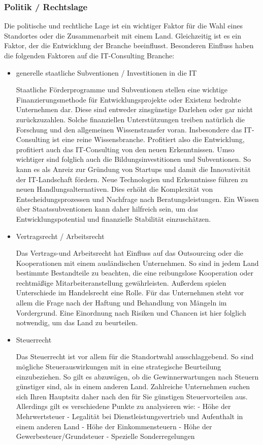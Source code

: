  \subsubsection{Politik / Rechtslage}
Die politische und rechtliche Lage ist ein wichtiger Faktor für die Wahl eines Standortes oder die Zusammenarbeit mit einem Land. Gleichzeitig ist es ein Faktor, der die Entwicklung der Branche beeinflusst.
Besonderen Einfluss haben die folgenden Faktoren auf die IT-Consulting Branche:
\begin{itemize} 
\item {generelle staatliche Subventionen / Investitionen in die IT}

 Staatliche Förderprogramme und Subventionen stellen eine wichtige Finanzierungsmethode für Entwicklungsprojekte oder Existenz bedrohte Unternehmen dar. Diese sind entweder zinsgünstige Darlehen oder gar nicht zurückzuzahlen.
 Solche finanziellen Unterstützungen treiben natürlich die Forschung und den allgemeinen Wissenstransfer voran. Insbesondere das IT-Consulting ist eine reine Wissensbranche. Profitiert also die Entwicklung, profitiert auch das IT-Consulting von den neuen Erkenntnissen. 
 Umso wichtiger sind folglich auch die Bildungsinvestitionen und Subventionen. So kann es als Anreiz zur Gründung von Startups und damit die Innovativität der IT-Landschaft fördern. Neue Technologien und Erkenntnisse führen zu neuen Handlungsalternativen. Dies erhöht die Komplexität von Entscheidungsprozessen und Nachfrage nach Beratungsleistungen.
Ein Wissen über Staatssubventionen kann daher hilfreich sein, um das Entwicklungspotential und finanzielle Stabilität einzuschätzen.

\item  {Vertragsrecht / Arbeitsrecht}

 Das Vertrags-und Arbeitsrecht hat Einfluss auf das Outsourcing oder die Kooperationen mit einem ausländischen Unternehmen. 
 So sind in jedem Land bestimmte Bestandteile zu beachten, die eine reibungslose Kooperation oder rechtmäßige Mitarbeiteranstellung gewährleisten. Außerdem spielen Unterschiede im Handelsrecht eine Rolle. 
Für das Unternehmen steht vor allem die Frage nach der Haftung und Behandlung von Mängeln im Vordergrund. 
Eine Einordnung nach Risiken und Chancen ist hier folglich notwendig, um das Land zu beurteilen. 

\item {Steuerrecht}

 Das Steuerrecht ist vor allem für die Standortwahl ausschlaggebend. 
 So sind mögliche Steuerauswirkungen mit in eine strategische Beurteilung  einzubeziehen. So gilt es abzuwägen, ob die Gewinnerwartungen nach Steuern günstiger sind, als in einem anderen Land. Zahlreiche Unternehmen suchen sich Ihren Hauptsitz daher nach den für Sie günstigen Steuervorteilen aus.
 Allerdings gilt es verschiedene Punkte zu analysieren wie:
 - Höhe der Mehrwertsteuer
 - Legalität bei Dienstleistungsvertrieb und Aufenthalt in einem anderen Land
 - Höhe der Einkommensteuern
 - Höhe der Gewerbesteuer/Grundsteuer
 - Spezielle Sonderregelungen
 

\end{itemize}
